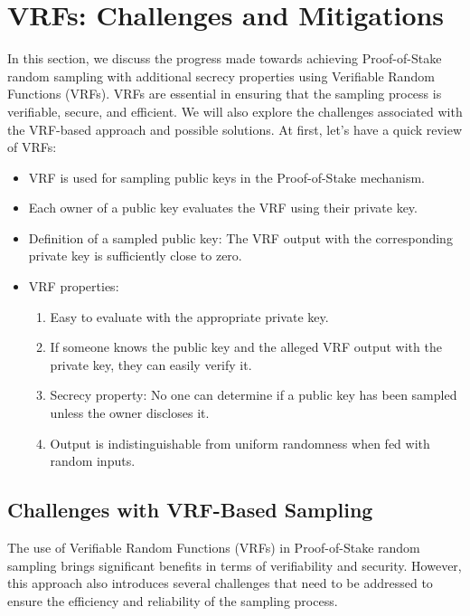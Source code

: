 \section{VRFs: Challenges and Mitigations}
In this section, we discuss the progress made towards achieving Proof-of-Stake random sampling with additional secrecy properties using Verifiable Random Functions (VRFs). VRFs are essential in ensuring that the sampling process is verifiable, secure, and efficient. We will also explore the challenges associated with the VRF-based approach and possible solutions.
At first, let's have a quick review of VRFs:
\begin{itemize}
  \item VRF is used for sampling public keys in the Proof-of-Stake mechanism.
  \item Each owner of a public key evaluates the VRF using their private key.
  \item Definition of a sampled public key: The VRF output with the corresponding private key is sufficiently close to zero.
  \item VRF properties:
  \begin{enumerate}
    \item Easy to evaluate with the appropriate private key.
    \item If someone knows the public key and the alleged VRF output with the private key, they can easily verify it.
    \item Secrecy property: No one can determine if a public key has been sampled unless the owner discloses it.
    \item Output is indistinguishable from uniform randomness when fed with random inputs.
  \end{enumerate}
\end{itemize}

\subsection{Challenges with VRF-Based Sampling}
The use of Verifiable Random Functions (VRFs) in Proof-of-Stake random sampling brings significant benefits in terms of verifiability and security. However, this approach also introduces several challenges that need to be addressed to ensure the efficiency and reliability of the sampling process.
